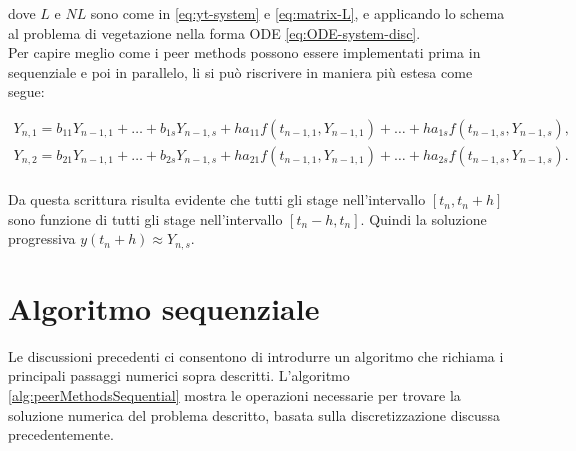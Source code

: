 \noindent dove $L$ e $NL$ sono come in \eqref{eq:yt-system} e \eqref{eq:matrix-L}, e applicando lo schema al problema di vegetazione nella forma ODE \eqref{eq:ODE-system-disc}. \\
\noindent Per capire meglio come i peer methods possono essere implementati prima in sequenziale e poi in parallelo, li si può riscrivere in maniera più estesa come segue:

 

\begin{gather}
    Y_{n,1} = b_{11}Y_{n-1, 1} + \ldots + b_{1s}Y_{n-1, s} + ha_{11}f(t_{n-1, 1}, Y_{n-1,1}) +  \ldots + ha_{1s}f(t_{n-1, s}, Y_{n-1,s}),\nonumber\\
    Y_{n,2} = b_{21}Y_{n-1, 1} + \ldots + b_{2s}Y_{n-1, s} + ha_{21}f(t_{n-1, 1}, Y_{n-1,1}) +  \ldots + ha_{2s}f(t_{n-1, s}, Y_{n-1,s}). \nonumber\\
    \label{eq:extended-peer-methods}
\end{gather}

\noindent Da questa scrittura risulta evidente che tutti gli stage nell'intervallo $[t_n, t_n + h]$ sono funzione di tutti gli stage nell'intervallo $[t_{n} - h, t_{n}]$. Quindi la soluzione progressiva $y(t_n + h) \approx Y_{n,s}$.

\section{Algoritmo sequenziale} \label{sec:approccio-sequenziale}
\noindent Le discussioni precedenti ci consentono di introdurre un algoritmo che richiama i principali passaggi numerici sopra descritti.
L'algoritmo \ref{alg:peerMethodsSequential} mostra le operazioni necessarie per trovare la soluzione numerica del problema descritto, basata sulla discretizzazione discussa precedentemente.

\newpage

